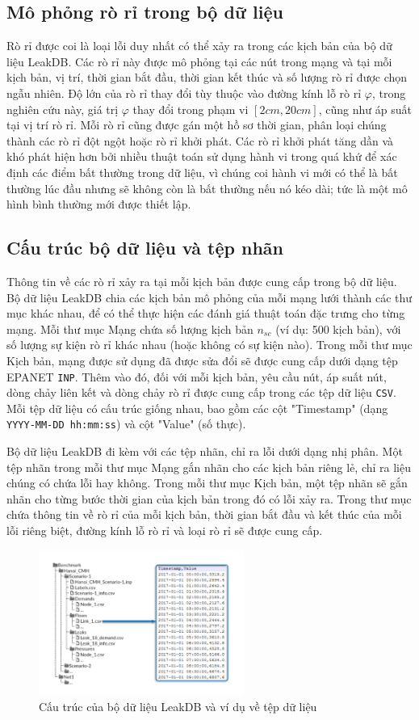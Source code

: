 \subsection{Mô phỏng rò rỉ trong bộ dữ liệu}

Rò rỉ được coi là loại lỗi duy nhất có thể xảy ra trong các kịch bản của bộ dữ liệu LeakDB. Các rò rỉ này được mô phỏng tại các nút trong mạng và tại mỗi kịch bản, vị trí, thời gian bắt đầu, thời gian kết thúc và số lượng rò rỉ được chọn ngẫu nhiên. Độ lớn của rò rỉ thay đổi tùy thuộc vào đường kính lỗ rò rỉ $\varphi$, trong nghiên cứu này, giá trị $\varphi$ thay đổi trong phạm vi $[2cm, 20cm]$, cũng như áp suất tại vị trí rò rỉ. Mỗi rò rỉ cũng được gán một hồ sơ thời gian, phân loại chúng thành các rò rỉ đột ngột hoặc rò rỉ khởi phát. Các rò rỉ khởi phát tăng dần và khó phát hiện hơn bởi nhiều thuật toán sử dụng hành vi trong quá khứ để xác định các điểm bất thường trong dữ liệu, vì chúng coi hành vi mới có thể là bất thường lúc đầu nhưng sẽ không còn là bất thường nếu nó kéo dài; tức là một mô hình bình thường mới được thiết lập.

\subsection{Cấu trúc bộ dữ liệu và tệp nhãn}

Thông tin về các rò rỉ xảy ra tại mỗi kịch bản được cung cấp trong bộ dữ liệu. Bộ dữ liệu LeakDB chia các kịch bản mô phỏng của mỗi mạng lưới thành các thư mục khác nhau, để có thể thực hiện các đánh giá thuật toán đặc trưng cho từng mạng. Mỗi thư mục Mạng chứa số lượng kịch bản $n_{sc}$ (ví dụ: 500 kịch bản), với số lượng sự kiện rò rỉ khác nhau (hoặc không có sự kiện nào). Trong mỗi thư mục Kịch bản, mạng được sử dụng đã được sửa đổi sẽ được cung cấp dưới dạng tệp EPANET \texttt{INP}. Thêm vào đó, đối với mỗi kịch bản, yêu cầu nút, áp suất nút, dòng chảy liên kết và dòng chảy rò rỉ được cung cấp trong các tệp dữ liệu \texttt{CSV}. Mỗi tệp dữ liệu có cấu trúc giống nhau, bao gồm các cột "Timestamp" (dạng \texttt{YYYY-MM-DD hh:mm:ss}) và cột "Value" (số thực).

Bộ dữ liệu LeakDB đi kèm với các tệp nhãn, chỉ ra lỗi dưới dạng nhị phân. Một tệp nhãn trong mỗi thư mục Mạng gắn nhãn cho các kịch bản riêng lẻ, chỉ ra liệu chúng có chứa lỗi hay không. Trong mỗi thư mục Kịch bản, một tệp nhãn sẽ gắn nhãn cho từng bước thời gian của kịch bản trong đó có lỗi xảy ra. Trong thư mục chứa thông tin về rò rỉ của mỗi kịch bản, thời gian bắt đầu và kết thúc của mỗi lỗi riêng biệt, đường kính lỗ rò rỉ và loại rò rỉ sẽ được cung cấp.

\begin{figure}[ht]
\centering
\includegraphics[width=0.6\textwidth]{image/section5_2/structure_of_leak_db.PNG}
\caption{Cấu trúc của bộ dữ liệu LeakDB và ví dụ về tệp dữ liệu}
\end{figure}